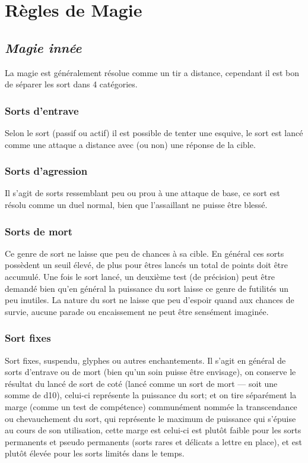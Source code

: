\section{Règles de Magie}

\subsection{\em Magie innée}
La magie est généralement résolue comme un tir a distance, cependant il est bon de séparer les sort dans 4 catégories.

\subsubsection{Sorts d’entrave}
Selon le sort (passif ou actif) il est possible de tenter une esquive, le sort est lancé comme une attaque a distance avec (ou non) une réponse de la cible.

\subsubsection{Sorts d’agression}
Il s’agit de sorts ressemblant peu ou prou à une attaque de base, ce sort est résolu comme un duel normal, bien que l’assaillant ne puisse être blessé.

\subsubsection{Sorts de mort}
Ce genre de sort ne laisse que peu de chances à sa cible.
En général ces sorts possèdent un seuil élevé, de plus pour êtres lancés un total de points doit être accumulé. Une fois le sort lancé, 
un deuxième test (de précision) peut être demandé bien qu’en général la puissance du sort laisse ce genre de futilités un peu inutiles.
La nature du sort ne laisse que peu d’espoir quand aux chances de survie, aucune parade ou encaissement ne peut être sensément imaginée.

\subsubsection{Sort fixes}
Sort fixes, suspendu, glyphes ou autres enchantements.
Il s’agit en général de sorts d’entrave ou de mort (bien qu’un soin puisse être envisage), 
on conserve le résultat du lancé de sort de coté (lancé comme un sort de mort — soit une somme de d10), celui-ci représente la puissance du sort; et on tire séparément la marge (comme un test de compétence) communément nommée la transcendance ou chevauchement du sort, qui représente le maximum de puissance qui s'épuise au cours de son utilisation, cette marge est celui-ci est plutôt faible pour les sorts permanents et pseudo permanents (sorts rares et délicats a lettre en place), et est plutôt élevée pour les sorts limités dans le temps.

